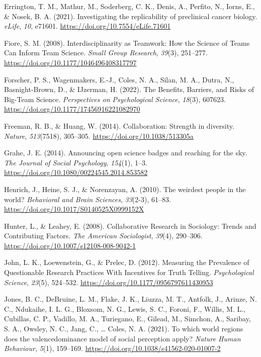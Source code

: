 \documentclass[
  man,floatsintext]{apa7}
\newlength{\cslhangindent}
\newenvironment{CSLReferences}[2] %
 {\begin{list}{}{%
  \setlength{\itemindent}{0pt}
  \setlength{\leftmargin}{0pt}
  \setlength{\parsep}{0pt}
  \ifodd #1
   \setlength{\leftmargin}{\cslhangindent}
   \setlength{\itemindent}{-1\cslhangindent}
  \fi
  \setlength{\itemsep}{#2\baselineskip}}}
 {\end{list}}
\begin{document}
\begin{CSLReferences}{1}{0}
Errington, T. M., Mathur, M., Soderberg, C. K., Denis, A., Perfito, N., Iorns, E., \& Nosek, B. A. (2021). Investigating the replicability of preclinical cancer biology. \emph{eLife}, \emph{10}, e71601. \url{https://doi.org/10.7554/eLife.71601}

Fiore, S. M. (2008). Interdisciplinarity as Teamwork: How the Science of Teams Can Inform Team Science. \emph{Small Group Research}, \emph{39}(3), 251--277. \url{https://doi.org/10.1177/1046496408317797}

Forscher, P. S., Wagenmakers, E.-J., Coles, N. A., Silan, M. A., Dutra, N., Basnight-Brown, D., \& IJzerman, H. (2022). The Benefits, Barriers, and Risks of Big-Team Science. \emph{Perspectives on Psychological Science}, \emph{18}(3), 607623. \url{https://doi.org/10.1177/17456916221082970}

Freeman, R. B., \& Huang, W. (2014). Collaboration: Strength in diversity. \emph{Nature}, \emph{513}(7518), 305--305. \url{https://doi.org/10.1038/513305a}

Grahe, J. E. (2014). Announcing open science badges and reaching for the sky. \emph{The Journal of Social Psychology}, \emph{154}(1), 1--3. \url{https://doi.org/10.1080/00224545.2014.853582}

Henrich, J., Heine, S. J., \& Norenzayan, A. (2010). The weirdest people in the world? \emph{Behavioral and Brain Sciences}, \emph{33}(2-3), 61--83. \url{https://doi.org/10.1017/S0140525X0999152X}

Hunter, L., \& Leahey, E. (2008). Collaborative Research in Sociology: Trends and Contributing Factors. \emph{The American Sociologist}, \emph{39}(4), 290--306. \url{https://doi.org/10.1007/s12108-008-9042-1}

John, L. K., Loewenstein, G., \& Prelec, D. (2012). Measuring the Prevalence of Questionable Research Practices With Incentives for Truth Telling. \emph{Psychological Science}, \emph{23}(5), 524--532. \url{https://doi.org/10.1177/0956797611430953}

Jones, B. C., DeBruine, L. M., Flake, J. K., Liuzza, M. T., Antfolk, J., Arinze, N. C., Ndukaihe, I. L. G., Bloxsom, N. G., Lewis, S. C., Foroni, F., Willis, M. L., Cubillas, C. P., Vadillo, M. A., Turiegano, E., Gilead, M., Simchon, A., Saribay, S. A., Owsley, N. C., Jang, C., \ldots{} Coles, N. A. (2021). To which world regions does the valence{\textendash}dominance model of social perception apply? \emph{Nature Human Behaviour}, \emph{5}(1), 159--169. \url{https://doi.org/10.1038/s41562-020-01007-2}


\end{CSLReferences}
\end{document}
